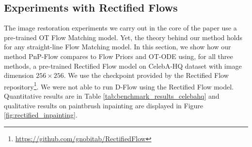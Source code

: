 \documentclass{article} %
\theoremstyle{definition}
\begin{document}
\subsection{Experiments with Rectified Flows}
\label{sec:app_rectified}
The image restoration experiments we carry out in the core of the paper use a pre-trained OT Flow Matching model. 
Yet, the theory behind our method holds for any straight-line Flow Matching model. 
In this section, we show how our method PnP-Flow compares to Flow Priors and OT-ODE using, for all three methods, a pre-trained Rectified Flow model \cite{liu2023flow} on CelebA-HQ dataset \citep{karras2018progressive} with image dimension $256\times 256$.
We use the checkpoint provided by the Rectified Flow repository\footnote{\hyperlink{gnobitab/RectifiedFlow}{https://github.com/gnobitab/RectifiedFlow}}. We were not able to run D-Flow using the Rectified Flow model. 
Quantitative results are in Table \ref{tab:benchmark_results_celebahq} and qualitative results on paintbrush inpainting are displayed in Figure \ref{fig:rectified_inpainting}. 
\end{document}
